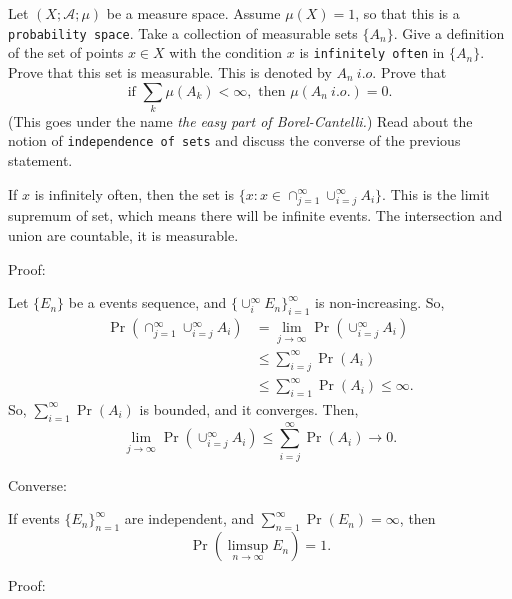 \documentclass[12pt]{article}
\newenvironment{exercise}[1]{\begin{tcolorbox}[colback=black!15, colframe=black!80, breakable, title=#1]}{\end{tcolorbox}}
\newenvironment{solution}{\begin{tcolorbox}[colback=white, colframe=black!50, breakable, title=Solution. ]\setlength{\parskip}{0.8em}}{\end{tcolorbox}}
\begin{document}
    

    \begin{exercise}{8}
        Let $(X; \mathscr{A}; \mu)$ be a measure space. Assume $\mu(X) = 1$, so that this is a \texttt{probability space}. Take a collection of measurable sets $\{A_n\}$. Give a definition of the set of points $x \in X$ with the condition $x$ is \texttt{infinitely often} in $\{A_n\}$. Prove that this set is measurable. This is denoted by $A_n\ i.o.$ Prove that
        \[\text{if } \sum_k \mu(A_k)<\infty, \text{ then } \mu(A_n\ i.o.)=0. \]
        (This goes under the name \emph{the easy part of Borel-Cantelli.}) Read about the
        notion of \texttt{independence of sets} and discuss the converse of the previous
        statement.
    \end{exercise}

    \begin{solution}
        If $x$ is infinitely often, then the set is $\{x: x\in \cap_{j=1}^\infty \cup_{i=j}^\infty A_i\}$. This is the limit supremum of set, which means there will be infinite events. The intersection and union are countable, it is measurable. 

        Proof: 

        Let $\{E_n\}$ be a events sequence, and $\{\cup_i^\infty E_n\}_{i=1}^\infty$ is non-increasing. So, 
        \[
            \begin{aligned}
                \Pr(\cap_{j=1}^\infty\cup_{i=j}^\infty A_i)&=\lim_{j\to\infty} \Pr(\cup_{i=j}^\infty A_i)\\
                &\leqslant \sum_{i=j}^\infty \Pr(A_i)\\
                &\leqslant \sum_{i=1}^\infty \Pr(A_i)\leqslant \infty. 
            \end{aligned}
        \]
        So, $\sum_{i=1}^\infty \Pr(A_i)$ is bounded, and it converges. Then, 
        \[
            \lim_{j\to\infty} \Pr(\cup_{i=j}^\infty A_i)\leqslant \sum_{i=j}^\infty \Pr(A_i)\to 0. 
        \]

        Converse: 

        If events $\{E_{n}\}_{n=1}^{\infty }$ are independent, and $\sum _{n=1}^{\infty }\Pr(E_{n})=\infty$, then 
        \[
            \Pr(\limsup _{n\to \infty }E_{n})=1. 
        \]

        Proof: 


\end{solution}
\end{document}
